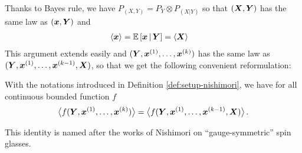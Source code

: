 \documentclass[12pt,nocut]{article}
\begin{document}
Thanks to Bayes rule, we have $P_{(X,Y)} = P_{Y}\!\otimes \! P_{(X|Y)}$ so that $({\boldsymbol X},{\boldsymbol Y})$ has the same law as $({\boldsymbol x},{\boldsymbol Y})$ and
\begin{align*}
\langle {\boldsymbol x} \rangle &= \mathbb{E}\left[ {\boldsymbol x} \, | \, {\boldsymbol Y} \right] = \langle {\boldsymbol X} \rangle
\end{align*}
This argument extends easily and $({\boldsymbol Y},{\boldsymbol x}^{(1)}, \dots, {\boldsymbol x}^{(k)})$ has the same law as $({\boldsymbol Y},{\boldsymbol x}^{(1)}, \dots,{\boldsymbol x}^{(k-1)}, {\boldsymbol X})$, so that we get the following convenient reformulation:
\begin{proposition} \label{prop:nishimori}
With the notations introduced in Definition \ref{def:setup-nishimori}, we have for all continuous bounded function $f$
	$$
\big\langle f({\boldsymbol Y},{\boldsymbol x}^{(1)}, \dots, {\boldsymbol x}^{(k)}) \big\rangle
	=
\big\langle f({\boldsymbol Y},{\boldsymbol x}^{(1)}, \dots, {\boldsymbol x}^{(k-1)}, {\boldsymbol X}) \big\rangle\,.
	$$
\end{proposition}
This identity is named after the works of Nishimori \cite{nishimori1980exact,nishimori1981internal} on ``gauge-symmetric'' spin glasses.
\end{document}
